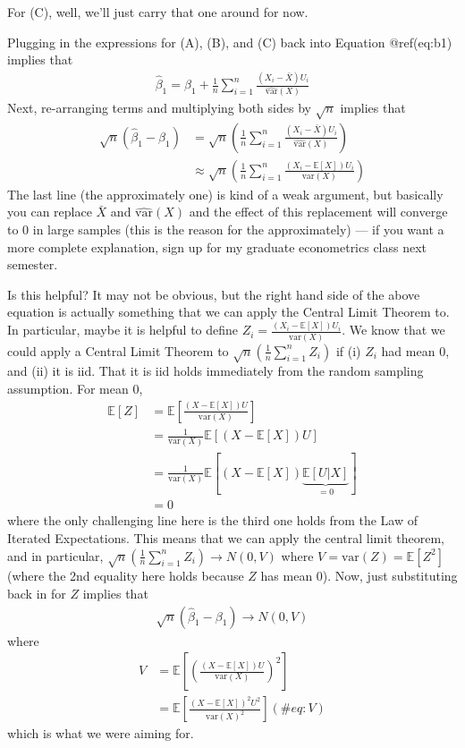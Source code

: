 \documentclass[
  letterpaper,
  DIV=11,
  numbers=noendperiod]{scrreprt}
\begin{document}
For (C), well, we'll just carry that one around for now.

Plugging in the expressions for (A), (B), and (C) back into Equation
@ref(eq:b1) implies that \begin{align*}
  \hat{\beta}_1 = \beta_1 + \frac{1}{n} \sum_{i=1}^n \frac{(X_i - \bar{X}) U_i}{\widehat{\mathrm{var}}(X)}
\end{align*} Next, re-arranging terms and multiplying both sides by
\(\sqrt{n}\) implies that \begin{align*}
  \sqrt{n}(\hat{\beta}_1 - \beta_1) &= \sqrt{n} \left(\frac{1}{n} \sum_{i=1}^n \frac{(X_i - \bar{X}) U_i}{\widehat{\mathrm{var}}(X)}\right) \\
  & \approx \sqrt{n} \left(\frac{1}{n} \sum_{i=1}^n \frac{(X_i - \mathbb{E}[X]) U_i}{\mathrm{var}(X)}\right)
\end{align*} The last line (the approximately one) is kind of a weak
argument, but basically you can replace \(\bar{X}\) and
\(\widehat{\mathrm{var}}(X)\) and the effect of this replacement will
converge to 0 in large samples (this is the reason for the
approximately) --- if you want a more complete explanation, sign up for
my graduate econometrics class next semester.

Is this helpful? It may not be obvious, but the right hand side of the
above equation is actually something that we can apply the Central Limit
Theorem to. In particular, maybe it is helpful to define
\(Z_i = \frac{(X_i - \mathbb{E}[X]) U_i}{\mathrm{var}(X)}\). We know
that we could apply a Central Limit Theorem to
\(\sqrt{n}\left( \frac{1}{n} \sum_{i=1}^n Z_i \right)\) if (i) \(Z_i\)
had mean 0, and (ii) it is iid. That it is iid holds immediately from
the random sampling assumption. For mean 0, \begin{align*}
  \mathbb{E}[Z] &= \mathbb{E}\left[ \frac{(X - \mathbb{E}[X]) U}{\mathrm{var}(X)}\right] \\
  &= \frac{1}{\mathrm{var}(X)} \mathbb{E}[(X - \mathbb{E}[X]) U] \\
  &= \frac{1}{\mathrm{var}(X)} \mathbb{E}[(X - \mathbb{E}[X]) \underbrace{\mathbb{E}[U|X]}_{=0}] \\
  &= 0
\end{align*} where the only challenging line here is the third one holds
from the Law of Iterated Expectations. This means that we can apply the
central limit theorem, and in particular,
\(\sqrt{n} \left( \frac{1}{n} \sum_{i=1}^n Z_i \right) \rightarrow N(0,V)\)
where \(V=\mathrm{var}(Z) = \mathbb{E}[Z^2]\) (where the 2nd equality
here holds because \(Z\) has mean 0). Now, just substituting back in for
\(Z\) implies that \begin{align*}
  \sqrt{n}(\hat{\beta}_1 - \beta_1) \rightarrow N(0,V)
\end{align*} where \begin{align}
  V &= \mathbb{E}\left[ \left( \frac{(X - \mathbb{E}[X]) U}{\mathrm{var}(X)} \right)^2 \right] \nonumber \\
  &= \mathbb{E}\left[ \frac{(X - \mathbb{E}[X])^2 U^2}{\mathrm{var}(X)^2}\right] (\#eq:V)
\end{align} which is what we were aiming for.
\end{document}
